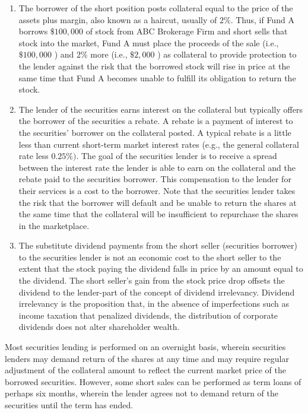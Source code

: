 \documentclass[11pt]{article}
\begin{document}
\begin{enumerate}
  \item The borrower of the short position posts collateral equal to the price of the assets plus margin, also known as a haircut, usually of $2 \%$. Thus, if Fund A borrows $\$ 100,000$ of stock from ABC Brokerage Firm and short sells that stock into the market, Fund A must place the proceeds of the sale (i.e., $\$ 100,000$ ) and $2 \%$ more (i.e., $\$ 2,000$ ) as collateral to provide protection to the lender against the risk that the borrowed stock will rise in price at the same time that Fund A becomes unable to fulfill its obligation to return the stock.

  \item The lender of the securities earns interest on the collateral but typically offers the borrower of the securities a rebate. A rebate is a payment of interest to the securities' borrower on the collateral posted. A typical rebate is a little less than current short-term market interest rates (e.g., the general collateral rate less $0.25 \%)$. The goal of the securities lender is to receive a spread between the interest rate the lender is able to earn on the collateral and the rebate paid to the securities borrower. This compensation to the lender for their services is a cost to the borrower. Note that the securities lender takes the risk that the borrower will default and be unable to return the shares at the same time that the collateral will be insufficient to repurchase the shares in the marketplace.

  \item The substitute dividend payments from the short seller (securities borrower) to the securities lender is not an economic cost to the short seller to the extent that the stock paying the dividend falls in price by an amount equal to the dividend. The short seller's gain from the stock price drop offsets the dividend to the lender-part of the concept of dividend irrelevancy. Dividend irrelevancy is the proposition that, in the absence of imperfections such as income taxation that penalized dividends, the distribution of corporate dividends does not alter shareholder wealth.

\end{enumerate}

Most securities lending is performed on an overnight basis, wherein securities lenders may demand return of the shares at any time and may require regular adjustment of the collateral amount to reflect the current market price of the borrowed securities. However, some short sales can be performed as term loans of\\
perhaps six months, wherein the lender agrees not to demand return of the securities until the term has ended.
\end{document}
